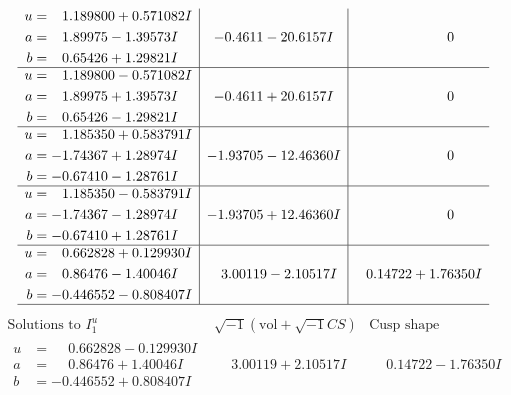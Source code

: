 \documentclass[1p]{elsarticle_modified}
\theoremstyle{definition}
\newcommand{\I}{\sqrt{-1}}
\begin{document}
$$\begin{array}{c|c|c}
\begin{aligned}
u &= \phantom{-}1.189800 + 0.571082 I \\
a &= \phantom{-}1.89975 - 1.39573 I \\
b &= \phantom{-}0.65426 + 1.29821 I\end{aligned}
 & -0.4611 - 20.6157 I & \phantom{-0.000000 } 0 \\ \hline\begin{aligned}
u &= \phantom{-}1.189800 - 0.571082 I \\
a &= \phantom{-}1.89975 + 1.39573 I \\
b &= \phantom{-}0.65426 - 1.29821 I\end{aligned}
 & -0.4611 + 20.6157 I & \phantom{-0.000000 } 0 \\ \hline\begin{aligned}
u &= \phantom{-}1.185350 + 0.583791 I \\
a &= -1.74367 + 1.28974 I \\
b &= -0.67410 - 1.28761 I\end{aligned}
 & -1.93705 - 12.46360 I & \phantom{-0.000000 } 0 \\ \hline\begin{aligned}
u &= \phantom{-}1.185350 - 0.583791 I \\
a &= -1.74367 - 1.28974 I \\
b &= -0.67410 + 1.28761 I\end{aligned}
 & -1.93705 + 12.46360 I & \phantom{-0.000000 } 0 \\ \hline\begin{aligned}
u &= \phantom{-}0.662828 + 0.129930 I \\
a &= \phantom{-}0.86476 - 1.40046 I \\
b &= -0.446552 - 0.808407 I\end{aligned}
 & \phantom{-}3.00119 - 2.10517 I & \phantom{-}0.14722 + 1.76350 I\\
 \hline 
 \end{array}$$\newpage$$\begin{array}{c|c|c}  
\text{Solutions to }I^u_{1}& \I (\text{vol} + \sqrt{-1}CS) & \text{Cusp shape}\\
 \hline 
\begin{aligned}
u &= \phantom{-}0.662828 - 0.129930 I \\
a &= \phantom{-}0.86476 + 1.40046 I \\
b &= -0.446552 + 0.808407 I\end{aligned}
 & \phantom{-}3.00119 + 2.10517 I & \phantom{-}0.14722 - 1.76350 I \\ \hline\begin{aligned}

\end{aligned}
\end{array}$$
\end{document}
